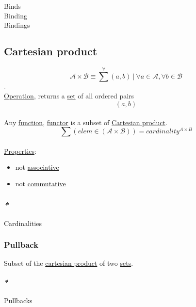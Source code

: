 \documentclass[11pt]{article}
\begin{document}
\label{org4d3a6be}Binds\\
\label{org45a7ea1}Binding\\
\label{org5f07c7c}Bindings\\

\subsection{\label{org434cb99}Cartesian product}
\label{sec:org38d6a03}
$$ \mathcal{A} \times \mathcal{B} \equiv \sum^{\forall}{(a,b)} \ | \ \forall a \in \mathcal{A}, \forall b \in \mathcal{B} $$.\\
\hyperref[org87d485b]{Operation}, returns a \hyperref[orgbed80ba]{set} of all ordered pairs $$ (a, b) $$\\

Any \hyperref[orgeb5cddb]{function}, \hyperref[org6073683]{functor} is a subset of \hyperref[org434cb99]{Cartesian product}.\\

$$ \sum{(elem \in (\mathcal{A} \times \mathcal{B}))}  = cardinality^{A \times B} $$\\

\hyperref[org763ad6b]{Properties}:\\
\begin{itemize}
\item not \hyperref[org31bffbb]{associative}\\
\item not \hyperref[orgcb2a02d]{commutative}\\
\end{itemize}

\subsubsection{\emph{*}}
\label{sec:org1d6e7b1}

\label{org54cdea2}Cardinalities\\

\subsubsection{\label{orge80417b}Pullback}
\label{sec:orgabbaea6}
Subset of the \hyperref[org434cb99]{cartesian product} of two \hyperref[org4e7443a]{sets}.\\

\paragraph{\emph{*}}
\label{sec:org964995a}
\label{org74e2585}Pullbacks\\
\end{document}
